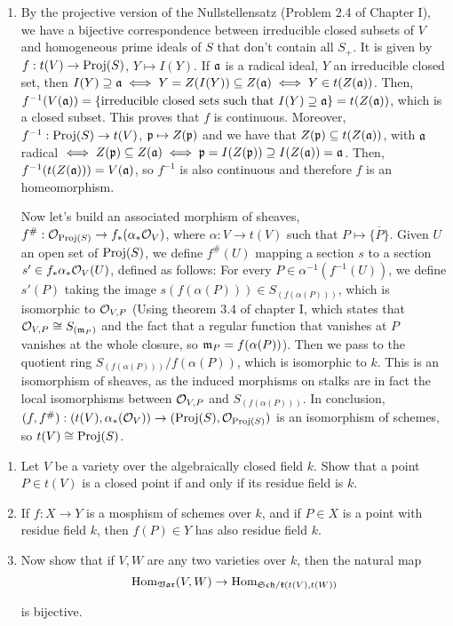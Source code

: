 \begin{sol}
\begin{enumerate}[label=\alph*)]
		\item By the projective version of the Nullstellensatz (Problem 2.4 of Chapter I), we have a bijective correspondence between irreducible closed subsets of $V$ and homogeneous prime ideals of $S$ that don't contain all $S_+$. It is given by $f: t(V) \to \mathrm{Proj}(S)$, $Y \mapsto I(Y)$. If $\mathfrak{a}$ is a radical ideal, $Y$ an irreducible closed set, then $I(Y) \supseteq \mathfrak{a} \iff Y = Z(I(Y)) \subseteq Z(\mathfrak{a}) \iff Y \in t(Z(\mathfrak{a}))$. Then, $f^{-1}(V(\mathfrak{a})) = \{\text{irreducible closed sets such that } I(Y) \supseteq \mathfrak{a} \} = t(Z(\mathfrak{a}))$, which is a closed subset. This proves that $f$ is continuous. Moreover, $f^{-1}: \mathrm{Proj}(S) \to t(V)$, $\mathfrak{p} \mapsto Z(\mathfrak{p})$ and we have that $Z(\mathfrak{p}) \subseteq t(Z(\mathfrak{a}))$, with $\mathfrak{a}$ radical $\iff Z(\mathfrak{p}) \subseteq Z(\mathfrak{a}) \iff \mathfrak{p} = I(Z(\mathfrak{p})) \supseteq I(Z(\mathfrak{a})) = \mathfrak{a}$. Then, $f^{-1}(t(Z(\mathfrak{a}))) = V(\mathfrak{a})$, so $f^{-1}$ is also continuous and therefore $f$ is an homeomorphism.

		Now let's build an associated morphism of sheaves, $f^{\#}: \mathcal{O}_{\mathrm{Proj}(S)} \to f_*(\alpha_* \mathcal{O}_V)$, where $\alpha: V \to t(V)$ such that $P \mapsto \overline{\{P\}}$. Given $U$ an open set of $\mathrm{Proj}(S)$, we define $f^{\#}(U)$ mapping a section $s$ to a section $s' \in f_*\alpha_* \mathcal{O}_V(U)$, defined as follows: For every $P \in \alpha^{-1}(f^{-1}(U))$, we define $s'(P)$ taking the image $s(f(\alpha(P))) \in S_{(f(\alpha(P)))}$, which is isomorphic to $\mathcal{O}_{V,P}$ (Using theorem 3.4 of chapter I, which states that $\mathcal{O}_{V,P} \cong S_{(\mathfrak{m}_P)}$ and the fact that a regular function that vanishes at $P$ vanishes at the whole closure, so $\mathfrak{m}_P = f(\alpha(P))$). Then we pass to the quotient ring $S_{(f(\alpha(P)))}/f(\alpha(P))$, which is isomorphic to $k$. This is an isomorphism of sheaves, as the induced morphisms on stalks are in fact the local isomorphisms between $\mathcal{O}_{V,P}$ and $S_{(f(\alpha(P)))}$. In conclusion, $(f,f^{\#}): (t(V), \alpha_*(\mathcal{O}_V)) \to (\mathrm{Proj}(S), \mathcal{O}_{\mathrm{Proj}(S)})$ is an isomorphism of schemes, so $t(V) \cong \mathrm{Proj}(S)$.		
	\end{enumerate}
\end{sol}

\begin{ex}
	\begin{enumerate}[label=\alph*)]
		\item Let $V$ be a variety over the algebraically closed field $k$. Show that a point $P \in t(V)$ is a closed point if and only if its residue field is $k$.

		\item If $f: X \to Y$ is a mosphism of schemes over $k$, and if $P \in X$ is a point with residue field $k$, then $f(P) \in Y$ has also residue field $k$.

		\item Now show that if $V,W$ are any two varieties over $k$, then the natural map
		\[
			\mathrm{Hom}_{\mathfrak{Var}}(V,W) \to \mathrm{Hom}_{\mathfrak{Sch/k}(t(V),t(W))}
		\]

		is bijective.
	\end{enumerate}
\end{ex}

